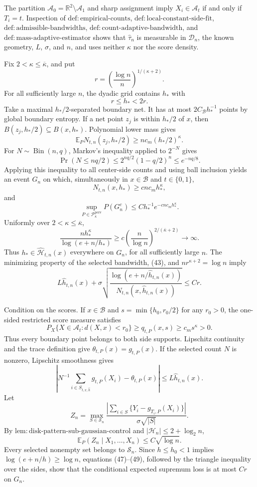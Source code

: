 The partition \(\mathcal A_0=\mathbb R^2\setminus\mathcal A_1\) and sharp assignment imply \(X_i\in\mathcal A_t\) if and only if \(T_i=t\). Inspection of \(\mathrm{def:empirical\text{-}counts}\), \(\mathrm{def:local\text{-}constant\text{-}side\text{-}fit}\), \(\mathrm{def:admissible\text{-}bandwidths}\), \(\mathrm{def:count\text{-}adaptive\text{-}bandwidth}\), and \(\mathrm{def:mass\text{-}adaptive\text{-}estimator}\) shows that \(\widehat\tau_n\) is measurable in \(\mathcal D_n\), the known geometry, \(L\), \(\sigma\), and \(n\), and uses neither \(\kappa\) nor the score density.

Fix \(2<\kappa\le\overline\kappa\), and put
\[
 r=\left(\frac{\log n}{n}\right)^{1/(\kappa+2)}.
\]
For all sufficiently large \(n\), the dyadic grid contains \(h_*\) with
\[
 r\le h_*<2r. \tag{43}
\]
Take a maximal \(h_*/2\)-separated boundary net. It has at most \(2C_{\mathcal B}h_*^{-1}\) points by global boundary entropy. If a net point \(z_j\) is within \(h_*/2\) of \(x\), then \(B(z_j,h_*/2)\subseteq B(x,h_*)\). Polynomial lower mass gives
\[
 \mathbb E_PN_{t,n}(z_j,h_*/2)\ge nc_m(h_*/2)^{\kappa}. \tag{44}
\]
For \(N\sim\operatorname{Bin}(n,q)\), Markov's inequality applied to \(2^{-N}\) gives
\[
 \Pr(N\le nq/2)\le2^{nq/2}(1-q/2)^n\le e^{-nq/8}.
\]
Applying this inequality to all center-side counts and using ball inclusion yields an event \(G_n\) on which, simultaneously in \(x\in\mathcal B\) and \(t\in\{0,1\}\),
\[
 N_{t,n}(x,h_*)\ge c nc_mh_*^{\kappa},
\]
and
\[
 \sup_{P\in\mathcal P_{\kappa}^{\mathrm{perv}}}P(G_n^c)
 \le Ch_*^{-1}e^{-cnc_mh_*^{\kappa}}. \tag{45}
\]
Uniformly over \(2<\kappa\le\overline\kappa\),
\[
 \frac{nh_*^{\kappa}}{\log(e+n/h_*)}
 \ge c\left(\frac n{\log n}\right)^{2/(\overline\kappa+2)}\longrightarrow\infty. \tag{46}
\]
Thus \(h_*\in\widehat{\mathcal H}_{t,n}(x)\) everywhere on \(G_n\), for all sufficiently large \(n\). The minimizing property of the selected bandwidth, (43), and \(nr^{\kappa+2}=\log n\) imply
\[
 L\widehat h_{t,n}(x)+\sigma\sqrt{\frac{\log(e+n/\widehat h_{t,n}(x))}{N_{t,n}(x,\widehat h_{t,n}(x))}}
 \le Cr. \tag{47}
\]

Condition on the scores. If \(x\in\mathcal B\) and \(s=\min\{h_0,r_0/2\}\) for any \(r_0>0\), the one-sided restricted score measure satisfies
\[
 P_X\{X\in\mathcal A_t:d(X,x)<r_0\}\ge q_{t,P}(x,s)\ge c_ms^\kappa>0.
\]
Thus every boundary point belongs to both side supports. Lipschitz continuity and the trace definition give \(\theta_{t,P}(x)=g_{t,P}(x)\). If the selected count \(N\) is nonzero, Lipschitz smoothness gives
\[
 \left|N^{-1}\sum_{i\in S_{t,x,\widehat h}}g_{t,P}(X_i)-\theta_{t,P}(x)\right|
 \le L\widehat h_{t,n}(x). \tag{48}
\]
Let
\[
 Z_n=\max_{S\in\mathscr S_n}
 \frac{|\sum_{i\in S}\{Y_i-g_{T_i,P}(X_i)\}|}{\sigma\sqrt{|S|}}.
\]
By \(\mathrm{lem:disk\text{-}pattern\text{-}sub\text{-}gaussian\text{-}control}\) and \(|\mathcal H_n|\le2+\log_2n\),
\[
 \mathbb E_P(Z_n\mid X_1,\ldots,X_n)\le C\sqrt{\log n}. \tag{49}
\]
Every selected nonempty set belongs to \(\mathscr S_n\). Since \(h\le h_0<1\) implies \(\log(e+n/h)\ge\log n\), equations (47)--(49), followed by the triangle inequality over the sides, show that the conditional expected supremum loss is at most \(Cr\) on \(G_n\).

